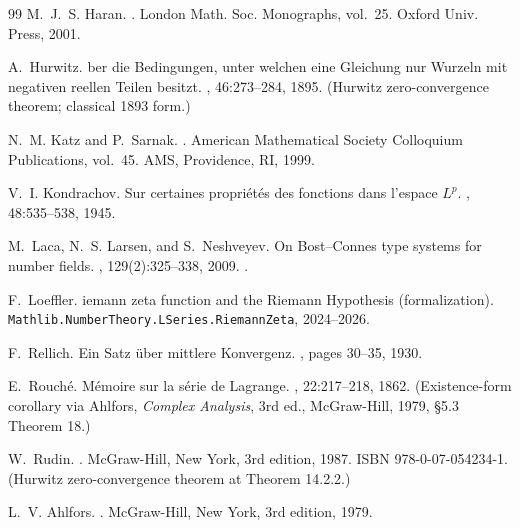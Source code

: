 \begin{thebibliography}{99}
M.~J.~S. Haran.
.
\newblock London Math. Soc. Monographs, vol.~25. Oxford Univ. Press, 2001.

A.~Hurwitz.
ber die {B}edingungen, unter welchen eine {G}leichung nur
  {W}urzeln mit negativen reellen {T}eilen besitzt.
, 46:273--284, 1895. (Hurwitz zero-convergence
  theorem; classical 1893 form.)


N.~M. Katz and P.~Sarnak.
.
\newblock American Mathematical Society Colloquium Publications, vol.~45. AMS,
  Providence, RI, 1999.

V.~I. Kondrachov.
\newblock Sur certaines propri{\'e}t{\'e}s des fonctions dans l'espace $L^p$.
, 48:535--538, 1945.


M.~Laca, N.~S. Larsen, and S.~Neshveyev.
\newblock On {B}ost--{C}onnes type systems for number fields.
, 129(2):325--338, 2009.
\newblock {}.

F.~Loeffler.
iemann zeta function and the {R}iemann {H}ypothesis (formalization).
\newblock \texttt{Mathlib.NumberTheory.LSeries.RiemannZeta}, 2024--2026.


F.~Rellich.
\newblock Ein {S}atz {\"u}ber mittlere {K}onvergenz.
, pages
  30--35, 1930.

E.~Rouch{\'e}.
\newblock M{\'e}moire sur la s{\'e}rie de {L}agrange.
, 22:217--218, 1862.
\newblock (Existence-form corollary via Ahlfors, {\em Complex Analysis},
  3rd ed., McGraw-Hill, 1979, \S 5.3 Theorem 18.)

W.~Rudin.
.
\newblock McGraw-Hill, New York, 3rd edition, 1987.
\newblock ISBN 978-0-07-054234-1.
\newblock (Hurwitz zero-convergence theorem at Theorem 14.2.2.)

L.~V. Ahlfors.
.
\newblock McGraw-Hill, New York, 3rd edition, 1979.



\end{thebibliography}

